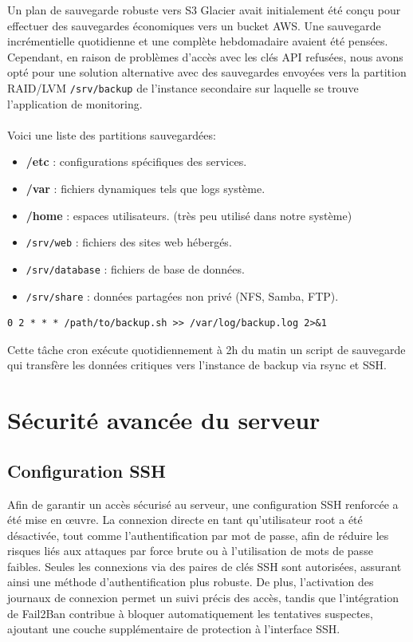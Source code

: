 \documentclass[a4paper,12pt]{article}
\begin{document}
Un plan de sauvegarde robuste vers S3 Glacier avait initialement été conçu pour effectuer des sauvegardes économiques vers un bucket AWS. Une sauvegarde incrémentielle quotidienne et une complète hebdomadaire avaient été pensées. Cependant, en raison de problèmes d'accès avec les clés API refusées, nous avons opté pour une solution alternative avec des sauvegardes envoyées vers la partition RAID/LVM  \texttt{/srv/backup} de l'instance secondaire sur laquelle se trouve l'application de monitoring.\\\\
Voici une liste des partitions sauvegardées:
\begin{itemize}
	\item \textbf{/etc} : configurations spécifiques des services.
	\item \textbf{/var} : fichiers dynamiques tels que logs système.
	\item \textbf{/home} : espaces utilisateurs. (très peu utilisé dans notre système)
	\item \texttt{/srv/web} : fichiers des sites web hébergés.
	\item \texttt{/srv/database} : fichiers de base de données.
	\item \texttt{/srv/share} : données partagées non privé (NFS, Samba, FTP).
\end{itemize}

\begin{lstlisting}[caption={Configuration Sauvegarde – /etc/crontab}]
0 2 * * * /path/to/backup.sh >> /var/log/backup.log 2>&1
\end{lstlisting}

Cette tâche cron exécute quotidiennement à 2h du matin un script de sauvegarde qui transfère les données critiques vers l'instance de backup via rsync et SSH.

\clearpage
\section{Sécurité avancée du serveur}

\subsection{Configuration SSH}

Afin de garantir un accès sécurisé au serveur, une configuration SSH renforcée a été mise en œuvre. La connexion directe en tant qu'utilisateur root a été désactivée, tout comme l'authentification par mot de passe, afin de réduire les risques liés aux attaques par force brute ou à l'utilisation de mots de passe faibles. Seules les connexions via des paires de clés SSH sont autorisées, assurant ainsi une méthode d'authentification plus robuste. De plus, l'activation des journaux de connexion permet un suivi précis des accès, tandis que l'intégration de Fail2Ban contribue à bloquer automatiquement les tentatives suspectes, ajoutant une couche supplémentaire de protection à l'interface SSH.
\end{document}
